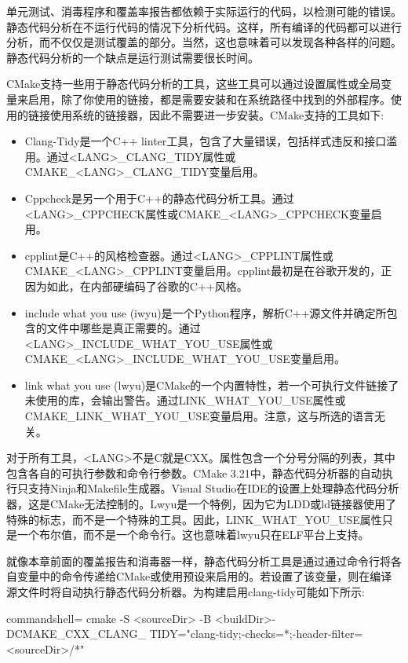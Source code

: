 单元测试、消毒程序和覆盖率报告都依赖于实际运行的代码，以检测可能的错误。静态代码分析在不运行代码的情况下分析代码。这样，所有编译的代码都可以进行分析，而不仅仅是测试覆盖的部分。当然，这也意味着可以发现各种各样的问题。静态代码分析的一个缺点是运行测试需要很长时间。

CMake支持一些用于静态代码分析的工具，这些工具可以通过设置属性或全局变量来启用，除了你使用的链接，都是需要安装和在系统路径中找到的外部程序。使用的链接使用系统的链接器，因此不需要进一步安装。CMake支持的工具如下:

\begin{itemize}
\item 
Clang-Tidy是一个C++ linter工具，包含了大量错误，包括样式违反和接口滥用。通过<LANG>\_CLANG\_TIDY属性或CMAKE\_<LANG>\_CLANG\_TIDY变量启用。

\item 
Cppcheck是另一个用于C++的静态代码分析工具。通过<LANG>\_CPPCHECK属性或CMAKE\_<LANG>\_CPPCHECK变量启用。

\item 
cpplint是C++的风格检查器。通过<LANG>\_CPPLINT属性或CMAKE\_<LANG>\_CPPLINT变量启用。cpplint最初是在谷歌开发的，正因为如此，在内部硬编码了谷歌的C++风格。

\item 
include what you use (iwyu)是一个Python程序，解析C++源文件并确定所包含的文件中哪些是真正需要的。通过<LANG>\_INCLUDE\_WHAT\_YOU\_USE属性或CMAKE\_<LANG>\_INCLUDE\_WHAT\_YOU\_USE变量启用。

\item 
link what you use (lwyu)是CMake的一个内置特性，若一个可执行文件链接了未使用的库，会输出警告。通过LINK\_WHAT\_YOU\_USE属性或CMAKE\_LINK\_WHAT\_YOU\_USE变量启用。注意，这与所选的语言无关。
\end{itemize}

对于所有工具，<LANG>不是C就是CXX。属性包含一个分号分隔的列表，其中包含各自的可执行参数和命令行参数。CMake 3.21中，静态代码分析器的自动执行只支持Ninja和Makefile生成器。Visual Studio在IDE的设置上处理静态代码分析器，这是CMake无法控制的。Lwyu是一个特例，因为它为LDD或ld链接器使用了特殊的标志，而不是一个特殊的工具。因此，LINK\_WHAT\_YOU\_USE属性只是一个布尔值，而不是一个命令行。这也意味着lwyu只在ELF平台上支持。

就像本章前面的覆盖报告和消毒器一样，静态代码分析工具是通过通过命令行将各自变量中的命令传递给CMake或使用预设来启用的。若设置了该变量，则在编译源文件时将自动执行静态代码分析器。为构建启用clang-tidy可能如下所示:

\begin{tcblisting}{commandshell={}}
cmake -S <sourceDir> -B <buildDir>-DCMAKE_CXX_CLANG_
  TIDY="clang-tidy;-checks=*;-header-filter=<sourceDir>/*"
\end{tcblisting}

